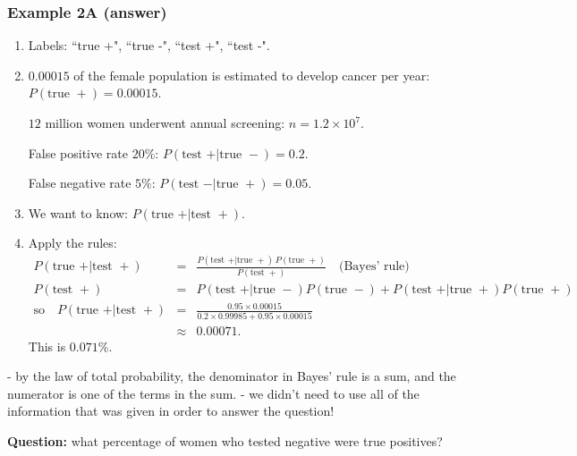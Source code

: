 \documentclass[t,8pt]{beamer}
\begin{document}
\begin{frame}
	\frametitle{Example 2A (answer)}
	{\small
		\begin{enumerate}
			\item Labels: ``true +", ``true -", ``test +", ``test -".
			\item $0.00015$ of the female population is estimated to develop cancer per year: $P(\text{true } +)=0.00015$. \par
			$12$ million women underwent annual screening: $n=1.2\times 10^7$. \par
			False positive rate $20\%$: $P(\text{test } +\vert \text{true } -)=0.2$. \par
			False negative rate $5\%$: $P(\text{test } -\vert \text{true } +)=0.05$.
			\item We want to know: $P(\text{true } +\vert \text{test } +)$.
			\item Apply the rules:
			\begin{eqnarray*}
				P(\text{true } +\vert \text{test } +)
				&=&\frac{P(\text{test } +\vert \text{true } +)\,P(\text{true } +)}
				{P(\text{test } +)}\quad\text{(Bayes' rule)}\\
				P(\text{test } +)
				&=&P(\text{test } +\vert \text{true } -)P(\text{true } -)
				+P(\text{test } +\vert \text{true } +)P(\text{true } +)\\
				\text{so}\quad
				P(\text{true } +\vert \text{test } +)
				&=&\frac{0.95\times 0.00015}{0.2\times 0.99985+0.95\times 0.00015}\\
				&\approx&0.00071.
			\end{eqnarray*}
			This is $0.071\%$.
		\end{enumerate}
	}
	{\small\color{NavyBlue} - by the law of total probability, the denominator in Bayes' rule is a sum, and the numerator is one of the terms in the sum.  
		- we didn't need to use all of the information that was given in order to answer the question!} \par
	{\bf Question:} what percentage of women who tested negative were true positives?
\end{frame}
\end{document}
